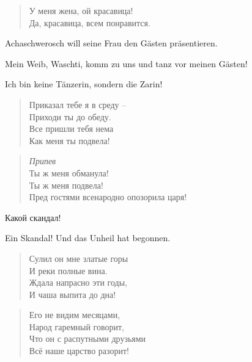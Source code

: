\documentclass[12pt,a4paper,titlepage]{article}
\begin{document}
\begin{drama}
\ahspeaks {}
\begin{verse}
У меня жена, ой красавица!\\
Да, красавица, всем понравится.\\
\end{verse}

\uespeaks
Achaschwerosch will seine Frau den Gästen präsentieren.

\ahspeaks
Mein Weib, Waschti, komm zu uns und tanz vor meinen Gästen!

\vspeaks
Ich bin keine Tänzerin, sondern die Zarin!

\ahspeaks {}
\begin{verse}
Приказал тебе я в среду --\\
Приходи ты до обеду.\\
Все пришли тебя нема\\
Как меня ты подвела!\\
\end{verse}

\begin{verse}
\textit{Припев}\\
Ты ж меня обманула!\\
Ты ж меня подвела!\\
Пред гостями всенародно опозорила царя!\\
\end{verse}

Какой скандал!

\uespeaks
Ein Skandal! Und das Unheil hat begonnen.


\scene


\vspeaks {}
\begin{verse}
Сулил он мне златые горы\\
И реки полные вина.\\
Ждала напрасно эти годы,\\
И чаша выпита до дна!\\
\end{verse}

\begin{verse}
Его не видим месяцами,\\
Народ гаремный говорит,\\
Что он с распутными друзьями\\
Всё наше царство разорит!\\
\end{verse}


\end{drama}
\end{document}
